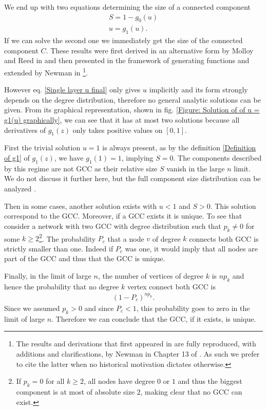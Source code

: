 \documentclass[
11pt, %
american, %
singlespacing, %
final, %
nolistspacing, %
liststotoc, %
headsepline, %
]{MastersDoctoralThesis} %
\begin{document}
We end up with two equations determining the size of a connected component
\begin{align}
	S = 1 - g_0(u) \label{Single layer S final} \\
	u = g_1(u). \label{Single layer u final}
\end{align}
If we can solve the second one we immediately get the size of the connected component $C$. These results were first derived in an alternative form by Molloy and Reed in \cite{molloy1995critical} and then presented in the framework of generating functions and extended by Newman \etal{} in \cite{newman2001random}\footnote{The results and derivations that first appeared in \cite{newman2001random} are fully reproduced, with additions and clarifications, by Newman in Chapter 13 of \cite{newman2010networks}. As such we prefer to cite the latter when no historical motivation dictates otherwise.}.

However eq. \eqref{Single layer u final} only gives $u$ implicitly and its form strongly depends on the degree distribution, therefore no general analytic solutions can be given. From its graphical representation, shown in fig. \ref{Figure: Solution of of u = g1(u) graphically}, we can see that it has at most two solutions because all derivatives of $g_1(z)$ only takes positive values on $[0, 1]$.

First the trivial solution $u = 1$ is always present, as by the definition \eqref{Definition of g1} of $g_1(z)$, we have $g_1(1) = 1$, implying $S = 0$. The components described by this regime are not GCC as their relative size $S$ vanish in the large $n$ limit. We do not discuss it further here, but the full component size distribution can be analyzed \cite{newman2010networks, kryven2017general}.

Then in some cases, another solution exists with $u < 1$ and $S > 0$. This solution correspond to the GCC. Moreover, if a GCC exists it is unique. To see that consider a network with two GCC with degree distribution such that $p_k \neq 0$ for some $k \geq 2$\footnote{If $p_k = 0$ for all $k \geq 2$, all nodes have degree $0$ or $1$ and thus the biggest component is at most of absolute size $2$, making clear that no GCC can exist.}. The probability $P_c$ that a node $v$ of degree $k$ connects both GCC is strictly smaller than one. Indeed if $P_c$ was one, it would imply that all nodes are part of the GCC and thus that the GCC is unique.

Finally, in the limit of large $n$, the number of vertices of degree $k$ is $n p_k$ and hence the probability that no degree $k$ vertex connect both GCC is
\begin{align}
	(1 - P_c)^{n p_k}.
\end{align}
Since we assumed $p_k > 0$ and since $P_c < 1$, this probability goes to zero in the limit of large $n$. Therefore we can conclude that the GCC, if it exists, is unique.
\end{document}

